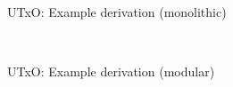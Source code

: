 \documentclass[main]{subfiles}
\begin{document}
\begin{frame}[fragile]{UTxO: Example derivation (monolithic)}
\begin{code}
\AgdaSpace{}%
\AgdaSpace{}%
\AgdaSymbol{)}\<%
\\
%
\>[18]\AgdaSpace{}%
\AgdaSymbol{:}\AgdaSpace{}%
\AgdaOperator{\AgdaFunction{[}}\AgdaSpace{}%
\AgdaSpace{}%
\AgdaOperator{\AgdaFunction{]}}\AgdaSpace{}%
\AgdaSpace{}%
\AgdaSymbol{(}\AgdaSpace{}%
\AgdaSpace{}%
\AgdaSpace{}%
\AgdaSpace{}%
\AgdaSymbol{)}\<%
\end{code}
\end{frame}
\begin{frame}{UTxO: Example derivation (modular)}
\begin{code}%
\>[0]\AgdaFunction{\AgdaUnderscore{}}\AgdaSpace{}%
\AgdaSymbol{:}\AgdaSpace{}%
\AgdaSpace{}%
\AgdaSpace{}%
\AgdaSpace{}%
\AgdaSpace{}%
\AgdaSpace{}%
\AgdaSpace{}%
\AgdaSpace{}%
\AgdaSpace{}%
\AgdaSpace{}%
\AgdaSpace{}%
\AgdaSpace{}%
\AgdaSpace{}%
\AgdaSpace{}%
\AgdaSpace{}%
\AgdaSpace{}%
\AgdaSpace{}%
\AgdaSpace{}%
\AgdaSpace{}%
\AgdaSpace{}%
\AgdaSpace{}%
\AgdaSpace{}%
\AgdaSpace{}%
\AgdaSpace{}%
\AgdaSpace{}%
\AgdaSpace{}%
\AgdaSpace{}%
\<%
\\
\>[0]\AgdaSymbol{\AgdaUnderscore{}}%
\>[610I]\AgdaSymbol{=}\AgdaSpace{}%
%
\>[612I]\AgdaSpace{}%
\AgdaSpace{}%
\AgdaSpace{}%
\AgdaSpace{}%
\AgdaSpace{}%
\AgdaSpace{}%
\AgdaSpace{}%
\AgdaSpace{}%
\AgdaSpace{}%
\AgdaSpace{}%
\AgdaSpace{}%
\AgdaSpace{}%

\end{code}
\end{frame}
\end{document}
